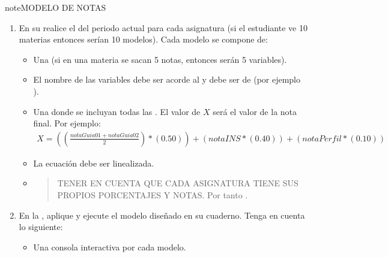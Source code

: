 \documentclass[letterpaper,10pt,spanish]{sphinxmanual}
\begin{document}
\begin{sphinxadmonition}{note}{MODELO DE NOTAS}
\begin{enumerate}
%
\item {} 
\sphinxAtStartPar
En su  realice el  del periodo actual para cada asignatura (si el estudiante ve 10 materias entonces serían 10 modelos). Cada modelo se compone de:
\begin{itemize}
\item {} 
\sphinxAtStartPar
Una  (si en una materia se sacan 5 notas, entonces serán 5 variables).

\item {} 
\sphinxAtStartPar
El nombre de las variables debe ser acorde al  y debe ser de  (por ejemplo ).

\item {} 
\sphinxAtStartPar
Una  donde se incluyan todas las . El valor de \( X \) será el valor de la nota final. Por ejemplo:
\begin{equation*}
\begin{split} X = \left( \left( \frac{notaGuia01+notaGuia02}{2} \right) * (0.50) \right) +  (notaINS*(0.40)) + (notaPerfil * (0.10)) \end{split}
\end{equation*}
\item {} 
\sphinxAtStartPar
La ecuación debe ser linealizada.

\item {} \begin{quote}

\sphinxAtStartPar
TENER EN CUENTA QUE CADA ASIGNATURA TIENE SUS PROPIOS PORCENTAJES Y NOTAS. Por tanto .
\end{quote}

\end{itemize}

\item {} 
\sphinxAtStartPar
En la , aplique y ejecute el modelo diseñado en su cuaderno. Tenga en cuenta lo siguiente:
\begin{itemize}
\item {} 
\sphinxAtStartPar
Una consola interactiva por cada modelo.


\end{itemize}
\end{enumerate}
\end{sphinxadmonition}
\end{document}
